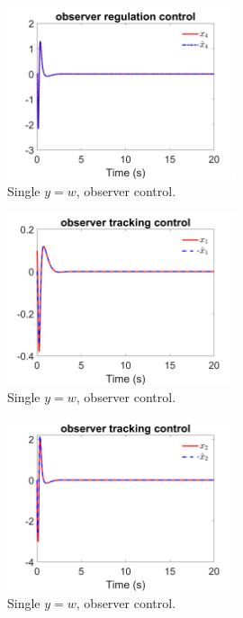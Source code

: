 \documentclass[12pt]{article}
\numberwithin{equation}{section}
\begin{document}
\begin{figure}[!ht]
    \centering
    \includegraphics[width=0.6\textwidth]{single_output_observer/fig8.png}
    \caption{Single $y = w$, observer control.}
\end{figure}

\begin{figure}[!ht]
    \centering
    \includegraphics[width=0.6\textwidth]{single_output_observer/fig9.png}
    \caption{Single $y = w$, observer control.}
\end{figure}

\begin{figure}[!ht]
    \centering
    \includegraphics[width=0.6\textwidth]{single_output_observer/fig10.png}
    \caption{Single $y = w$, observer control.}
\end{figure}
\end{document}
